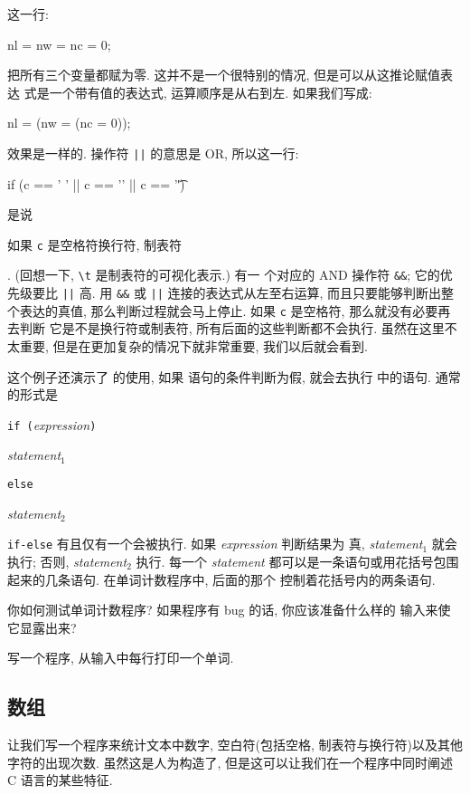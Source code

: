 这一行:
\begin{myverbatim}
    nl = nw = nc = 0;
\end{myverbatim}
把所有三个变量都赋为零. 这并不是一个很特别的情况, 但是可以从这推论赋值表达
式是一个带有值的表达式, 运算顺序是从右到左. 如果我们写成:
\begin{myverbatim}
    nl = (nw = (nc = 0));
\end{myverbatim}
效果是一样的. 操作符 \verb"||" 的意思是 OR, 所以这一行:
\begin{myverbatim}
    if (c == ' ' || c == '\n' || c == '\t')
\end{myverbatim}
是说\begin{myquotation}如果 \verb"c" 是空格符换行符, %
制表符\end{myquotation}. (回想一下, \verb"\t" 是制表符的可视化表示.) 有一 
个对应的 AND 操作符 \verb"&&"; 它的优先级要比 \verb"||" 高. 用 \verb"&&" 
或 \verb"||" 连接的表达式从左至右运算, 而且只要能够判断出整个表达的真值,
那么判断过程就会马上停止. 如果 \verb"c" 是空格符, 那么就没有必要再去判断
它是不是换行符或制表符, 所有后面的这些判断都不会执行. 虽然在这里不太重要,
但是在更加复杂的情况下就非常重要, 我们以后就会看到.

这个例子还演示了 \celse 的使用, 如果 \cif 语句的条件判断为假, 就会去执行
\celse 中的语句. 通常的形式是 \par
\begin{mypsudo}
\texttt{if (}\textit{expression}\texttt{)}  \par
\hspace{2em}\textit{statement}$_1$          \par
\texttt{else}                               \par
\hspace{2em}\textit{statement}$_2$          \par
\end{mypsudo}
\verb"if-else" 有且仅有一个会被执行. 如果 \textit{expression} 判断结果为
真, \textit{statement}$_1$ 就会执行; 否则, \textit{statement}$_2$ 执行.
每一个 \textit{statement} 都可以是一条语句或用花括号包围起来的几条语句.
在单词计数程序中, \celse 后面的那个 \cif 控制着花括号内的两条语句.

\exercise 你如何测试单词计数程序? 如果程序有 bug 的话, 你应该准备什么样的
输入来使它显露出来?

\exercise 写一个程序, 从输入中每行打印一个单词.

\subsection{数组}
让我们写一个程序来统计文本中数字, 空白符(包括空格, 制表符与换行符)以及其他
字符的出现次数. 虽然这是人为构造了, 但是这可以让我们在一个程序中同时阐述
C 语言的某些特征.

